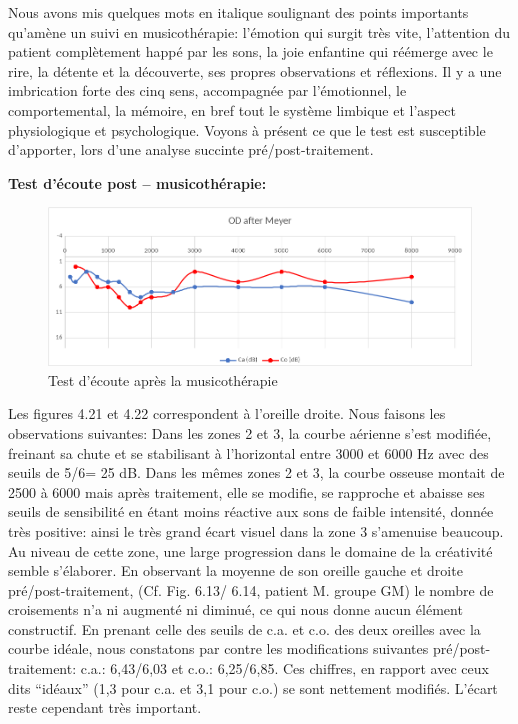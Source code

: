       Nous avons mis quelques mots en italique soulignant des  points
      importants qu'amène un suivi en musicothérapie: l'émotion qui surgit très
      vite,
      l'attention du patient complètement happé par les sons, la joie
      enfantine qui réémerge avec le rire, la détente et la découverte,
      ses propres observations et réflexions.
      Il y a une imbrication forte des cinq sens, accompagnée par l'émotionnel, le comportemental, la
      mémoire, en bref tout le système limbique et l'aspect
      physiologique et psychologique.
      Voyons à présent ce que le test est susceptible d'apporter, lors
      d'une analyse succinte pré/post-traitement.

\textbf{ Test d'écoute post -- musicothérapie:}
        
    	
 	
 	\begin{figure}[h]
 		\centering

 		\includegraphics[width=0.7\linewidth]{images/clinique/od_after_meyer.png}
 		\caption{Test d'écoute après la musicothérapie}
 		\label{fig:odaftermeyer}
 	\end{figure}
 Les figures 4.21 et 4.22 correspondent à l'oreille droite. 
        Nous faisons les observations suivantes:
      Dans les
        zones 2 et 3,  la courbe aérienne s'est modifiée, freinant sa
        chute et se stabilisant à l'horizontal entre 3000 et 6000 Hz
        avec des seuils de 5/6= 25 dB.
        Dans les mêmes zones 2 et 3, la
        courbe osseuse montait de 2500 à 6000 mais après traitement,
        elle se modifie, se rapproche et abaisse ses seuils de
        sensibilité en étant moins réactive aux sons de faible
        intensité, donnée très positive: ainsi le très grand écart visuel dans la zone 3 s'amenuise beaucoup. Au niveau de cette
        zone, une large progression dans
  le domaine de la créativité semble s'élaborer.
  En observant la moyenne de son oreille gauche et droite
  pré/post-traitement, (Cf. Fig. 6.13/ 6.14, patient M. groupe GM)  le
  nombre de croisements n'a ni augmenté ni diminué, ce qui nous donne
  aucun élément constructif.
  En prenant celle des
  seuils 
   de c.a. et c.o. des deux oreilles avec la courbe idéale, nous
  constatons par contre les modifications suivantes pré/post-traitement:
  c.a.: 6,43/6,03 et c.o.: 6,25/6,85.
  Ces chiffres, en rapport avec 
  ceux dits ``idéaux''  (1,3 pour c.a. et 3,1 pour c.o.) se sont nettement
  modifiés. L'écart reste cependant très important. %
 
